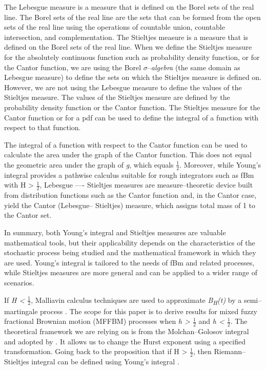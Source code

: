 \documentclass[12pt,a4paper]{report}
\numberwithin{equation}{section}
\begin{document}
The Lebesgue measure is a measure that is defined on the Borel sets of
the real line. The Borel sets of the real line are the sets that can be
formed from the open sets of the real line using the operations of
countable union, countable intersection, and complementation. The
Stieltjes measure is a measure that is defined on the Borel sets of the
real line.
When we define the Stieltjes measure for the absolutely continuous
function such as probability density function, or for the Cantor
function, we are using the Borel \emph{$\sigma$}--\emph{algebra} (the same
domain as Lebesgue measure) to define the sets on which the Stieltjes
measure is defined on. However, we are not using the Lebesgue measure to
define the values of the Stieltjes measure. The values of the Stieltjes
measure are defined by the probability density function or the Cantor
function. The Stieltjes measure for the Cantor function or for a pdf can
be used to define the integral of a function with respect to that
function. 

The integral of a function with respect to the Cantor function can be
used to calculate the area under the graph of the Cantor function. This
does not equal the geometric  area under the graph of \emph{g},
which equals $\frac{1}{2}$. Moreover, while Young's integral provides a pathwise
calculus suitable for rough integrators such as fBm with H
\textgreater{} $\frac{1}{2}$, Lebesgue ---- Stieltjes measures are measure--theoretic
device built from distribution functions such as the Cantor function
and, in the Cantor case, yield the Cantor (Lebesgue-- Stieltjes) measure,
which assigns total mass of 1 to the Cantor set.

In summary, both Young's integral and Stieltjes measures are valuable
mathematical tools, but their applicability depends on the
characteristics of the stochastic process being studied and the
mathematical framework in which they are used. Young's integral is
tailored to the needs of fBm and related processes, while Stieltjes
measures are more general and can be applied to a wider range of
scenarios.

If \emph{H \textless{} $\frac{1}{2}$}, Malliavin calculus techniques are used to
approximate \emph{B\textsubscript{H}(t)} by a semi--martingale process
\cite{als2000stochastic_78}. The scope for this paper is to derive results for mixed fuzzy fractional Brownian motion (MFFBM)
processes when \emph{h \textgreater{} $\frac{1}{2}$} and \emph{h \textless{} $\frac{1}{2}$}. The
theoretical framework we are relying on is from the Molchan--Golosov
integral and adopted by \cite{jost2006transformation_79}. It allows us to change the Hurst
exponent using a specified transformation. Going back to the proposition
that if H \textgreater{} $\frac{1}{2}$, then Riemann--Stieltjes integral can be defined using Young's integral \cite{young1936inequality_77}.
\end{document}
